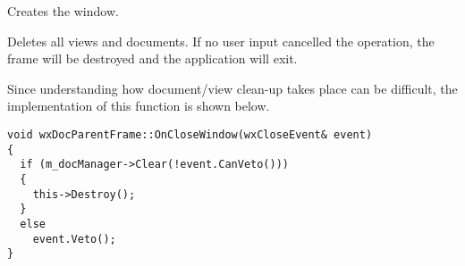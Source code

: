 
Creates the window.

\label{wxdocmdiparentframeonclosewindow}


Deletes all views and documents. If no user input cancelled the
operation, the frame will be destroyed and the application will exit.

Since understanding how document/view clean-up takes place can be difficult,
the implementation of this function is shown below.

\begin{verbatim}
void wxDocParentFrame::OnCloseWindow(wxCloseEvent& event)
{
  if (m_docManager->Clear(!event.CanVeto()))
  {
    this->Destroy();
  }
  else
    event.Veto();
}
\end{verbatim}

